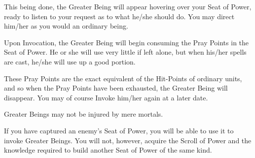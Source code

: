 This being done, the Greater Being will appear hovering over your Seat of Power, ready to listen to your request as to what he/she should do. You may direct him/her as you would an ordinary being.

Upon Invocation, the Greater Being will begin consuming the Pray Points in the Seat of Power. He or she will use very little if left alone, but when his/her spells are cast, he/she will use up a good portion.

These Pray Points are the exact equivalent of the Hit-Points of ordinary units, and so when the Pray Points have been exhausted, the Greater Being will disappear. You may of course Invoke him/her again at a later date.

Greater Beings may not be injured by mere mortals.

If you have captured an enemy’s Seat of Power, you will be able to use it to invoke Greater Beings. You will not, however, acquire the Scroll of Power and the knowledge required to build another Seat of Power of the same kind.
